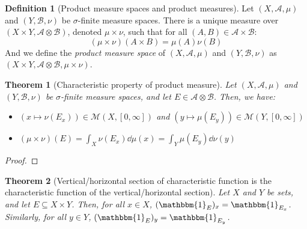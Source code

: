 \documentclass{article}
\newtheorem{theorem}{Theorem}[section]
\theoremstyle{definition}
\newtheorem{definition}{Definition}[section]
\theoremstyle{remark}
\theoremstyle{example}
\theoremstyle{notation}
\theoremstyle{axiom}
\begin{document}
\begin{definition}[Product measure spaces and product measures] %
		Let $(X, \mathcal{A}, \mu)$ and $(Y, \mathcal{B}, \nu)$ be $\sigma$-finite measure spaces. There is a unique measure over $(X \times Y, \mathcal{A} \otimes \mathcal{B})$, denoted $\mu \times \nu$, such that for all $(A, B) \in \mathcal{A} \times \mathcal{B}$:
				$$(\mu \times \nu)(A \times B) = \mu(A)\nu(B)$$
		And we define the \textit{product measure space} of $(X, \mathcal{A}, \mu)$ and $(Y, \mathcal{B}, \nu)$ as $(X \times Y, \mathcal{A} \otimes \mathcal{B}, \mu \times \nu)$.
\end{definition}


\begin{theorem}[Characteristic property of product measure] \label{thm:product-measure-charac} %
		Let $(X, \mathcal{A}, \mu)$ and $(Y, \mathcal{B}, \nu)$ be $\sigma$-finite measure spaces, and let $E \in \mathcal{A} \otimes \mathcal{B}$. Then, we have:
		\begin{itemize}
				\item $(x \mapsto \nu(E_x)) \in \mathcal{M}(X, [0, \infty])$ and $(y \mapsto \mu(E_y)) \in \mathcal{M}(Y, [0, \infty])$
				\item $(\mu \times \nu)(E) = \int_X \nu(E_x) \dd \mu(x) = \int_Y \mu(E_y) \dd \nu(y)$
		\end{itemize}
\end{theorem}

\begin{proof}
\end{proof}

\begin{theorem}[Vertical/horizontal section of characteristic function is the characteristic function of the vertical/horizontal section] \label{thm:section-charac-charac-section}%
		Let $X$ and $Y$ be sets, and let $E \subseteq X \times Y$. Then, for all $x \in X$, $(\mathbbm{1}_E)_x = \mathbbm{1}_{E_x}$. Similarly, for all $y \in Y$, $(\mathbbm{1}_E)_y = \mathbbm{1}_{E_y}$.
\end{theorem}
\end{document}

